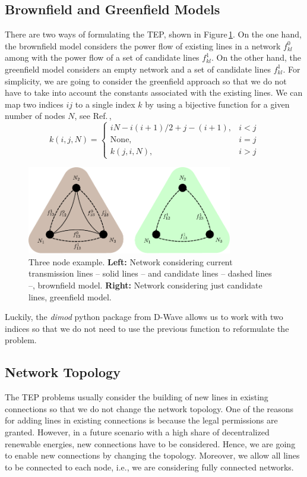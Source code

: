 \subsection{Brownfield and Greenfield Models}
There are two ways of formulating the TEP, shown in Figure\,\ref{fig: ThreeNode}. On the one hand, the brownfield model considers the power flow of existing lines in a network $f_{kl}^{0}$ among with the power flow of a set of candidate lines $f_{kl}^{1}$. On the other hand, the greenfield model considers an empty network and a set of candidate lines $f_{kl}^{1}$. For simplicity, we are going to consider the greenfield approach so that we do not have to take into account the constants associated with the existing lines. We can map two indices $ij$ to a single index $k$ by using a bijective function for a given number of nodes $N$, see Ref.\,\cite{Jain2021SolvingComputer},
\begin{equation}
k(i,j,N) = \begin{cases}
    iN - i\left(i+1\right)/2 + j - (i+1), & i<j\\
    \text{None},& i=j \\
    k(j,i,N), & i>j
\end{cases}
    \label{eq: TwoIndexesmap}
\end{equation}
\begin{figure}[H]
  \begin{center}
\includegraphics[width=0.8\textwidth]{Figures/3NodeBrownGreen.pdf}
  \end{center}
  \caption{Three node example. \textbf{Left:} Network considering current transmission lines -- solid lines -- and candidate lines -- dashed lines --, brownfield model. \textbf{Right:} Network considering just candidate lines, greenfield model.}
  \label{fig: ThreeNode}
\end{figure}
Luckily, the \textit{dimod} python package from D-Wave allows us to work with two indices so that we do not need to use the previous function to reformulate the problem. 
\subsection{Network Topology}
The TEP problems usually consider the building of new lines in existing connections so that we do not change the network topology. One of the reasons for adding lines in existing connections is because the legal permissions are granted. However, in a future scenario with a high share of decentralized renewable energies, new connections have to be considered. Hence, we are going to enable new connections by changing the topology. Moreover, we allow all lines to be connected to each node, i.e., we are considering fully connected networks.

